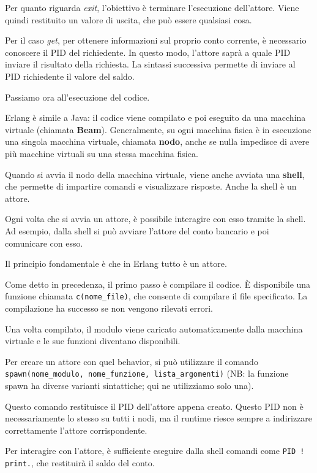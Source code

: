 \documentclass{article}
\begin{document}
Per quanto riguarda \textit{exit}, l'obiettivo è terminare l'esecuzione dell'attore. Viene quindi restituito un valore di uscita, che può essere qualsiasi cosa.

Per il caso \textit{get}, per ottenere informazioni sul proprio conto corrente, è necessario conoscere il PID del richiedente. In questo modo, l'attore saprà a quale PID inviare il risultato della richiesta. La sintassi successiva permette di inviare al PID richiedente il valore del saldo.

Passiamo ora all'esecuzione del codice.

Erlang è simile a Java: il codice viene compilato e poi eseguito da una macchina virtuale (chiamata \textbf{Beam}). Generalmente, su ogni macchina fisica è in esecuzione una singola macchina virtuale, chiamata \textbf{nodo}, anche se nulla impedisce di avere più macchine virtuali su una stessa macchina fisica.

Quando si avvia il nodo della macchina virtuale, viene anche avviata una \textbf{shell}, che permette di impartire comandi e visualizzare risposte. Anche la shell è un attore.

Ogni volta che si avvia un attore, è possibile interagire con esso tramite la shell. Ad esempio, dalla shell si può avviare l'attore del conto bancario e poi comunicare con esso.

Il principio fondamentale è che in Erlang tutto è un attore.

Come detto in precedenza, il primo passo è compilare il codice. È disponibile una funzione chiamata \texttt{c(nome\_file)}, che consente di compilare il file specificato. La compilazione ha successo se non vengono rilevati errori.

Una volta compilato, il modulo viene caricato automaticamente dalla macchina virtuale e le sue funzioni diventano disponibili.

Per creare un attore con quel behavior, si può utilizzare il comando \texttt{spawn(nome\_modulo, nome\_funzione, lista\_argomenti)} (NB: la funzione spawn ha diverse varianti sintattiche; qui ne utilizziamo solo una).

Questo comando restituisce il PID dell'attore appena creato. Questo PID non è necessariamente lo stesso su tutti i nodi, ma il runtime riesce sempre a indirizzare correttamente l'attore corrispondente.

Per interagire con l'attore, è sufficiente eseguire dalla shell comandi come \texttt{PID ! print.}, che restituirà il saldo del conto.
\end{document}
